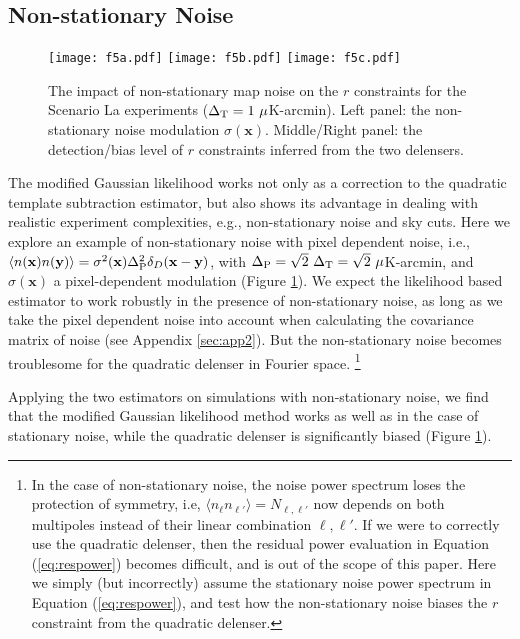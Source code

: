 \documentclass[aps, prd, reprint, nofootinbib, groupedaddress, showpacs]{revtex4-1}
\newcommand*\Bell{\ensuremath{\boldsymbol\ell}}
\begin{document}
\subsection{Non-stationary Noise }
\label{sec:nonsta}

\begin{figure*}
\centering
\texttt{[image: f5a.pdf]}%
\texttt{[image: f5b.pdf]}%
\texttt{[image: f5c.pdf]}
\caption{\label{fig:nonsta}
The impact of non-stationary map noise on the $r$ constraints for the Scenario La experiments
($\Delta_{\rm T} = 1\ \mu$K-arcmin).
Left panel: the non-stationary noise modulation $\sigma(\mathbf x)$.
Middle/Right panel: the detection/bias level of $r$ constraints inferred from the two delensers.}
\end{figure*}

The modified Gaussian likelihood  works not only as a correction to
the quadratic template subtraction estimator,
but also shows its advantage in dealing with realistic experiment complexities,
e.g., non-stationary noise and sky cuts.
Here we explore an example of non-stationary noise with pixel
dependent noise, i.e., $\left< n(\mathbf x) n(\mathbf y)\right>
= \sigma^2(\mathbf x)\Delta_{\rm P}^2 \delta_D(\mathbf x-\mathbf y)$,
with $\Delta_{\rm P}=\sqrt{2} \ \Delta_{\rm T} = \sqrt{2}\ \mu$K-arcmin, and
$\sigma(\mathbf x)$  a pixel-dependent modulation (Figure \ref{fig:nonsta}).
We expect the likelihood based estimator to work robustly in the presence of non-stationary noise,
as long as we take the pixel dependent noise into account
when calculating the covariance matrix of noise (see Appendix \ref{sec:app2}).
But the non-stationary noise becomes troublesome for
the quadratic delenser in  Fourier space.
\footnote{In the case of non-stationary noise,
the noise power spectrum loses the protection of symmetry,
i.e, $\langle n_{\Bell}n_{\Bell'}\rangle = N_{\Bell,\Bell'}$ now depends on
both multipoles instead of their linear combination $\Bell,\Bell'$.
If we were to correctly use the quadratic delenser,
then the residual power evaluation in Equation (\ref{eq:respower})
becomes difficult, and is out of the scope of this paper.
Here we simply (but incorrectly) assume the stationary noise power spectrum in Equation (\ref{eq:respower}),
and test how the non-stationary noise biases the $r$ constraint from the quadratic delenser.}

Applying the two estimators on simulations with non-stationary noise,
we find that the modified Gaussian likelihood method works as well as in the case of stationary noise,
while the quadratic delenser is significantly biased (Figure \ref{fig:nonsta}).
\end{document}
